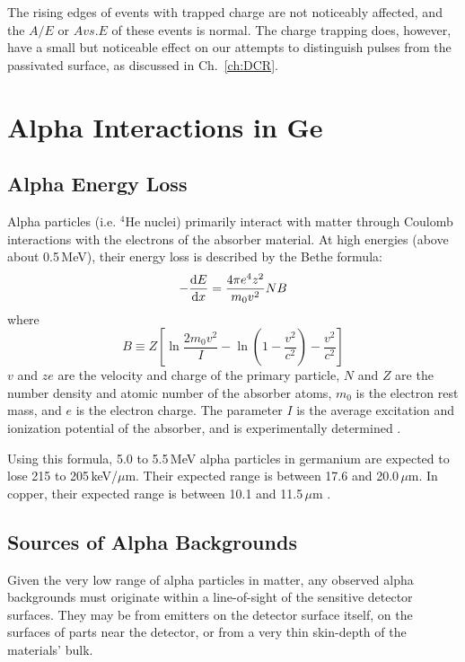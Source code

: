 The rising edges of events with trapped charge are not noticeably affected, and the $A/E$ or $A vs. E$ of these events is normal. The charge trapping does, however, have a small but noticeable effect on our attempts to distinguish pulses from the passivated surface, as discussed in Ch.~\ref{ch:DCR}.

\section{Alpha Interactions in Ge}
\subsection{Alpha Energy Loss}
Alpha particles (i.e. $^4$He nuclei) primarily interact with matter through Coulomb interactions with the electrons of the absorber material. At high energies (above about 0.5\,MeV), their energy loss is described by the Bethe formula:
\begin{equation}
 -\frac{\mathrm{d}E}{\mathrm{d}x}  = \frac{4\pi e^4 z^2}{m_0 v^2} N B \\
 \end{equation}
 where 
 \begin{equation}
  B \equiv Z\left[ \ln \frac{2 m_0 v^2}{I} - \ln(1-\frac{v^2}{c^2}) - \frac{v^2}{c^2} \right]
   \end{equation}
$v$ and $ze$ are the velocity and charge of the primary particle, $N$ and $Z$ are the number density and atomic number of the absorber atoms, $m_0$ is the electron rest mass, and $e$ is the electron charge. The parameter $I$ is the average excitation and ionization potential of the absorber, and is experimentally determined \cite{KnollText}.

Using this formula, 5.0 to 5.5\,MeV alpha particles in germanium are expected to lose 215 to 205\,keV/$\mu$m. Their expected range is between 17.6 and 20.0\,$\mu$m. In copper, their expected range is between 10.1 and 11.5\,$\mu$m \cite{SRIM}. 
   
\subsection{Sources of Alpha Backgrounds}
Given the very low range of alpha particles in matter, any observed alpha backgrounds must originate within a line-of-sight of the sensitive detector surfaces. They may be from emitters on the detector surface itself, on the surfaces of parts near the detector, or from a very thin skin-depth of the materials' bulk. 


